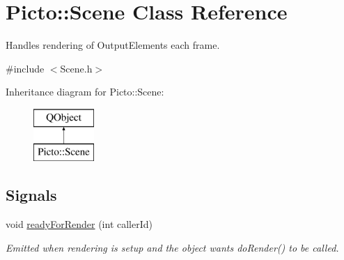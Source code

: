 \hypertarget{class_picto_1_1_scene}{\section{Picto\-:\-:Scene Class Reference}
\label{class_picto_1_1_scene}
}


Handles rendering of Output\-Elements each frame.  




{\ttfamily \#include $<$Scene.\-h$>$}

Inheritance diagram for Picto\-:\-:Scene\-:\begin{figure}[H]
\begin{center}
\leavevmode
\includegraphics[height=2.000000cm]{class_picto_1_1_scene}
\end{center}
\end{figure}
\subsection*{Signals}
\begin{DoxyCompactItemize}
\item 
void \hyperlink{class_picto_1_1_scene_a1558a1f1eec6582e509defd1ff684fb7}{ready\-For\-Render} (int caller\-Id)
\begin{DoxyCompactList}\small\item\em Emitted when rendering is setup and the object wants do\-Render() to be called. \end{DoxyCompactList}\end{DoxyCompactItemize}
